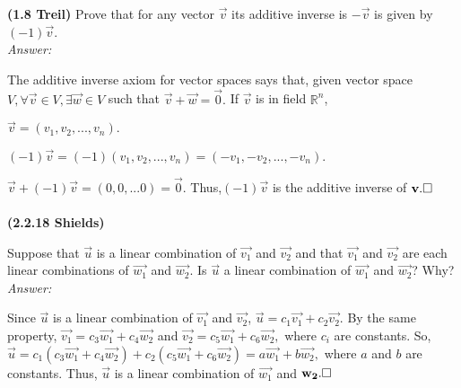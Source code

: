	
	\noindent\textbf{(1.8 Treil)}
	Prove that for any vector $\vec{v}$ its additive inverse is $-\vec{v}$ is given by $(-1)\vec{v}$.
	\\\textit{Answer:}
	
	The additive inverse axiom for vector spaces says that, given vector space $V,\forall \vec{v} \in V, \exists \vec{w} \in V$ such that $\vec{v}+\vec{w}=\vec{0}.$
	If $\vec{v}$ is in field $\mathbb{R}^n$,
	
	$\vec{v}=(v_1,v_2,...,v_n).$
	  
	$(-1)\vec{v}=(-1)(v_1,v_2,...,v_n)=(-v_1,-v_2,...,-v_n).$
	
	$\vec{v}+(-1)\vec{v}=(0,0,...0)=\vec{0}$.
	Thus,$(-1)\vec{v}$ is the additive inverse of $\vec{v}.\\
	\square$\\\\
	
	\noindent\textbf{(2.2.18 Shields)}
	
	Suppose that $\vec{u}$ is a linear combination of $\vec{v_1}$ and $\vec{v_2}$ and that $\vec{v_1}$ and $\vec{v_2}$ are each linear combinations of $\vec{w_1}$ and $\vec{w_2}$.  Is $\vec{u}$ a linear combination of $\vec{w_1}$ and $\vec{w_2}$?  Why?
	\\\textit{Answer:}
	
	Since $\vec{u}$ is a linear combination of $\vec{v_1}$ and $\vec{v_2}$, $\vec{u}=c_1\vec{v_1}+c_2\vec{v_2}.$  By the same property, $\vec{v_1}=c_3\vec{w_1}+c_4\vec{w_2}$ and $\vec{v_2}=c_5\vec{w_1}+c_6\vec{w_2},$  where $c_i$ are constants.  So, $\vec{u}=c_1(c_3\vec{w_1}+c_4\vec{w_2})+c_2(c_5\vec{w_1}+c_6\vec{w_2})=a\vec{w_1}+b\vec{w_2},$ where $a$ and $b$ are constants.  Thus, $\vec{u}$ is a linear combination of $\vec{w_1}$ and $\vec{w_2}.\\
	\square$\\\\